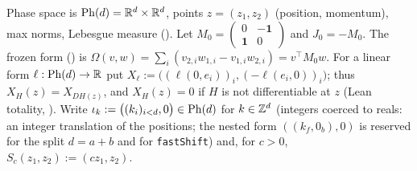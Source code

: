 Phase space is $\mathrm{Ph}(d)=\mathbb{R}^d\times\mathbb{R}^d$, points $z=(z_1,z_2)$ (position, momentum), max norms, Lebesgue measure (). Let $M_0=\left(\begin{smallmatrix}0&-\mathbf 1\\ \mathbf 1&0\end{smallmatrix}\right)$ and $J_0=-M_0$. The frozen form () is $\Omega(v,w)=\sum_i(v_{2,i}w_{1,i}-v_{1,i}w_{2,i})=v^{\top}M_0w$. For a linear form $\ell:\mathrm{Ph}(d)\to\mathbb{R}$ put $X_\ell:=\bigl((\ell(0,e_i))_i,(-\ell(e_i,0))_i\bigr)$; thus $X_H(z)=X_{DH(z)}$, and $X_H(z)=0$ if $H$ is not differentiable at $z$ (Lean totality, ). Write $\iota_k:=\bigl((k_i)_{i<d},0\bigr)\in\mathrm{Ph}(d)$ for $k\in\mathbb{Z}^d$ (integers coerced to reals: an integer translation of the positions; the nested form $((k_f,0_b),0)$ is reserved for the split $d=a+b$ and for \texttt{fastShift}) and, for $c>0$, $S_c(z_1,z_2):=(cz_1,z_2)$.

